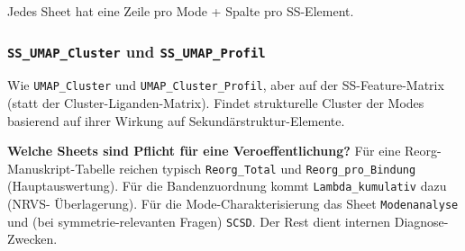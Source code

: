 \documentclass[11pt,a4paper,twoside]{article}
\theoremstyle{remark}
\begin{document}
Jedes Sheet hat eine Zeile pro Mode + Spalte pro SS-Element.

\subsubsection*{\texttt{SS\_UMAP\_Cluster} und \texttt{SS\_UMAP\_Profil}}

Wie \texttt{UMAP\_Cluster} und \texttt{UMAP\_Cluster\_Profil}, aber
auf der SS-Feature-Matrix (statt der Cluster-Liganden-Matrix). Findet
strukturelle Cluster der Modes basierend auf ihrer Wirkung auf
Sekund\"arstruktur-Elemente.

\begin{infobox}
\textbf{Welche Sheets sind Pflicht f\"ur eine Veroeffentlichung?}
F\"ur eine Reorg-Manuskript-Tabelle reichen typisch \texttt{Reorg\_Total}
und \texttt{Reorg\_pro\_Bindung} (Hauptauswertung). F\"ur die
Bandenzuordnung kommt \texttt{Lambda\_kumulativ} dazu (NRVS-
\"Uberlagerung). F\"ur die Mode-Charakterisierung das Sheet
\texttt{Modenanalyse} und (bei symmetrie-relevanten Fragen)
\texttt{SCSD}. Der Rest dient internen Diagnose-Zwecken.
\end{infobox}


\end{document}
